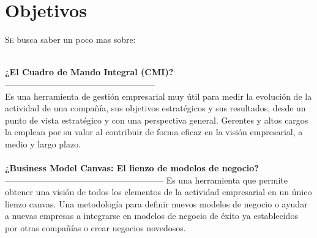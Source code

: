 \documentclass[twoside,twocolumn]{article}
\begin{document}
\section{Objetivos}
\begin{flushright}
\begin{itemize}
\lettrine[nindent=0em,lines=2]{S}e busca saber un poco mas sobre:

\textbf{}\\
\textbf{¿El Cuadro de Mando Integral (CMI)?}\\
-----------------------------------------------------
\textbf{}\\
Es una herramienta de gestión empresarial muy útil para medir la evolución de la actividad de una compañía, sus objetivos estratégicos y sus resultados, desde un punto de vista estratégico y con una perspectiva general. Gerentes y altos cargos la emplean por su valor al contribuir de forma eficaz en la visión empresarial, a medio y largo plazo.
\textbf{}\\
\textbf{}\\
\textbf{¿Business Model Canvas: El lienzo de modelos de negocio?}\\
--------------------------------------------------------
Es una herramienta que permite obtener una visión de todos los elementos de la actividad empresarial en un único lienzo canvas. Una metodología para definir nuevos modelos de negocio o ayudar a nuevas empresas a integrarse en modelos de negocio de éxito ya establecidos por otras compañías o crear negocios novedosos.


\end{itemize}
\end{flushright}
\end{document}
